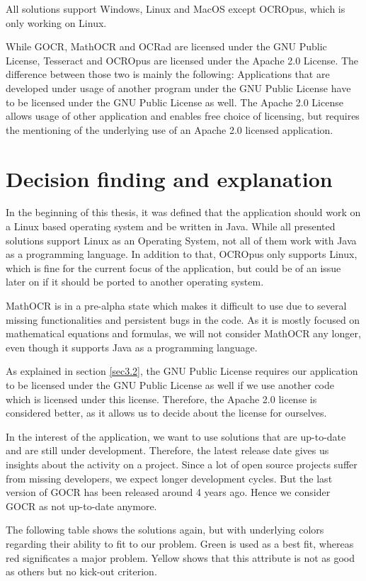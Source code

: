 All solutions support Windows, Linux and MacOS except OCROpus, which is only working on Linux.

While GOCR, MathOCR and OCRad are licensed under the GNU Public License, Tesseract and OCROpus are licensed under the Apache 2.0 License. The difference between those two is mainly the following: Applications that are developed under usage of another program under the GNU Public License have to be licensed under the GNU Public License as well. The Apache 2.0 License allows usage of other application and enables free choice of licensing, but requires the mentioning of the underlying use of an Apache 2.0 licensed application.


\label{OCRDecision}
\section{Decision finding and explanation}
In the beginning of this thesis, it was defined that the application should work on a Linux based operating system and be written in Java. While all presented solutions support Linux as an Operating System, not all of them work with Java as a programming language. In addition to that, OCROpus only supports Linux, which is fine for the current focus of the application, but could be of an issue later on if it should be ported to another operating system.

MathOCR is in a pre-alpha state which makes it difficult to use due to several missing functionalities and persistent bugs in the code. As it is mostly focused on mathematical equations and formulas, we will not consider MathOCR any longer, even though it supports Java as a programming language. 

As explained in section \ref{sec3.2}, the GNU Public License requires our application to be licensed under the GNU Public License as well if we use another code which is licensed under this license. Therefore, the Apache 2.0 license is considered better, as it allows us to decide about the license for ourselves.

In the interest of the application, we want to use solutions that are up-to-date and are still under development. Therefore, the latest release date gives us insights about the activity on a project. Since a lot of open source projects suffer from missing developers, we expect longer development cycles. But the last version of GOCR has been released around 4 years ago. Hence we consider GOCR as not up-to-date anymore.

The following table shows the solutions again, but with underlying colors regarding their ability to fit to our problem. Green is used as a best fit, whereas red significates a major problem. Yellow shows that this attribute is not as good as others but no kick-out criterion. 

